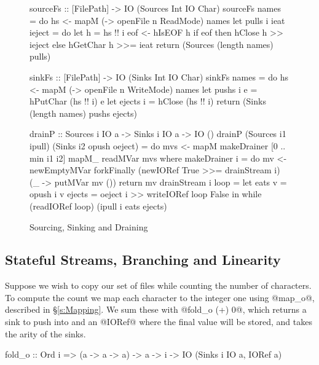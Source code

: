 
\begin{figure}
\begin{code}
sourceFs :: [FilePath] -> IO (Sources Int IO Char)
sourceFs names 
 = do hs <- mapM (\n -> openFile n ReadMode) names
      let pulls i ieat ieject
          = do let h = hs !! i
               eof <- hIsEOF h
               if eof then hClose   h >> ieject
                      else hGetChar h >>= ieat
      return (Sources (length names) pulls)

sinkFs  :: [FilePath] -> IO (Sinks Int IO Char)
sinkFs names 
 = do hs <- mapM (\n -> openFile n WriteMode) names
      let pushs  i e = hPutChar (hs !! i) e
      let ejects i   = hClose   (hs !! i)
      return (Sinks (length names) pushs ejects)

drainP :: Sources i IO a -> Sinks i IO a -> IO ()
drainP (Sources i1 ipull) (Sinks i2 opush oeject)
 = do mvs <- mapM makeDrainer [0 .. min i1 i2]
      mapM_ readMVar mvs
 where
  makeDrainer i = do
    mv <- newEmptyMVar
    forkFinally (newIORef True >>= drainStream i)
                (\_ -> putMVar mv ())
    return mv
  drainStream i loop =
    let eats v = opush i v
        ejects = oeject i >> writeIORef loop False
    in  while (readIORef loop) (ipull i eats ejects)
\end{code}

\caption{Sourcing, Sinking and Draining}
\label{f:Draining}
\end{figure}


\subsection{Stateful Streams, Branching and Linearity}
\label{s:Linearity}
Suppose we wish to copy our set of files while counting the number of characters.
To compute the count we map each character to the integer one using @map_o@, described in \S\ref{s:Mapping}.
We sum these with @fold_o (+) 0@, which returns a sink to push into and an @IORef@ where the final value will be stored, and takes the arity of the sinks.

\begin{code}
fold_o :: Ord i => (a -> a -> a) -> a -> i
                -> IO (Sinks i IO a, IORef a)
\end{code}

